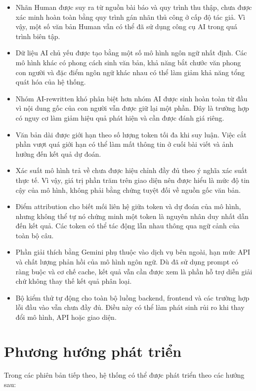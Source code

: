 \begin{itemize}
    \item Nhãn Human được suy ra từ nguồn bài báo và quy trình thu thập, chưa được xác minh hoàn toàn bằng quy trình gán nhãn thủ công ở cấp độ tác giả. Vì vậy, một số văn bản Human vẫn có thể đã sử dụng công cụ AI trong quá trình biên tập.
    \item Dữ liệu AI chủ yếu được tạo bằng một số mô hình ngôn ngữ nhất định. Các mô hình khác có phong cách sinh văn bản, khả năng bắt chước văn phong con người và đặc điểm ngôn ngữ khác nhau có thể làm giảm khả năng tổng quát hóa của hệ thống.
    \item Nhóm AI-rewritten khó phân biệt hơn nhóm AI được sinh hoàn toàn từ đầu vì nội dung gốc của con người vẫn được giữ lại một phần. Đây là trường hợp có nguy cơ làm giảm hiệu quả phát hiện và cần được đánh giá riêng.
    \item Văn bản dài được giới hạn theo số lượng token tối đa khi suy luận. Việc cắt phần vượt quá giới hạn có thể làm mất thông tin ở cuối bài viết và ảnh hưởng đến kết quả dự đoán.
    \item Xác suất mô hình trả về chưa được hiệu chỉnh đầy đủ theo ý nghĩa xác suất thực tế. Vì vậy, giá trị phần trăm trên giao diện nên được hiểu là mức độ tin cậy của mô hình, không phải bằng chứng tuyệt đối về nguồn gốc văn bản.
    \item Điểm attribution cho biết mối liên hệ giữa token và dự đoán của mô hình, nhưng không thể tự nó chứng minh một token là nguyên nhân duy nhất dẫn đến kết quả. Các token có thể tác động lẫn nhau thông qua ngữ cảnh của toàn bộ câu.
    \item Phần giải thích bằng Gemini phụ thuộc vào dịch vụ bên ngoài, hạn mức API và chất lượng phản hồi của mô hình ngôn ngữ. Dù đã sử dụng prompt có ràng buộc và cơ chế cache, kết quả vẫn cần được xem là phần hỗ trợ diễn giải chứ không thay thế kết quả phân loại.
    \item Bộ kiểm thử tự động cho toàn bộ luồng backend, frontend và các trường hợp lỗi đầu vào vẫn chưa đầy đủ. Điều này có thể làm phát sinh rủi ro khi thay đổi mô hình, API hoặc giao diện.
\end{itemize}

\section{Phương hướng phát triển}

Trong các phiên bản tiếp theo, hệ thống có thể được phát triển theo các hướng sau:

